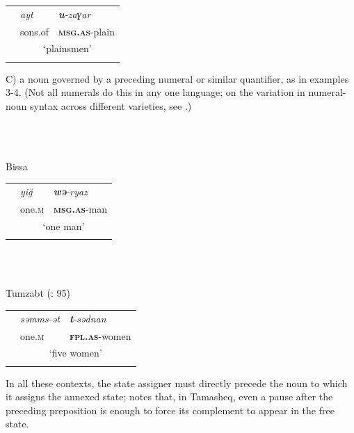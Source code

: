 \documentclass[output=paper]{langscibook}
\begin{document}
\begin{tabularx}{\textwidth}{XXX}
 & \textit{ayt} & \textbf{\textit{u}}\textit{{}-zaɣar}\\
\lsptoprule
& sons.of & \textbf{\textsc{msg.as}}{}-plain\\
& \multicolumn{2}{c}{‘plainsmen’}\\
\lspbottomrule
\end{tabularx}
\begin{styleStandarduser}
C) a noun governed by a preceding numeral or similar quantifier, as in examples 3-4. (Not all numerals do this in any one language; on the variation in numeral-noun syntax across different varieties, see \citet[212]{Galand2002}.)
\end{styleStandarduser}

\begin{styleStandarduser}
\ea%
    \label{ex:key:3}
    \gll \\
         \\
    \glt
    \z %

          Bissa \citep[67]{Genevois1973}
\end{styleStandarduser}


\begin{tabularx}{\textwidth}{XXX}
 & \textit{yiğ} & \textbf{\textit{wə}}\textit{{}-ryaz}\\
\lsptoprule
& one.\textsc{m} & \textbf{\textsc{msg.as}}{}-man\\
& \multicolumn{2}{c}{‘one man’}\\
\lspbottomrule
\end{tabularx}
\begin{styleStandarduser}
\ea%
    \label{ex:key:4}
    \gll \\
         \\
    \glt
    \z %

          Tumzabt (\citealt{AbdessalamAbdessalam1996}: 95)
\end{styleStandarduser}


\begin{tabularx}{\textwidth}{XXX}
 & \textit{səmms-ət} & \textbf{\textit{t}}\textit{{}-sədnan}\\
\lsptoprule
& one.\textsc{m} & \textbf{\textsc{fpl.as}}{}-women\\
& \multicolumn{2}{c}{‘five women’}\\
\lspbottomrule
\end{tabularx}
\begin{styleStandarduser}
In all these contexts, the state assigner must directly precede the noun to which it assigns the annexed state; \citet[148]{Heath2005a} notes that, in Tamasheq, even a pause after the preceding preposition is enough to force its complement to appear in the free state.
\end{styleStandarduser}
\end{document}
